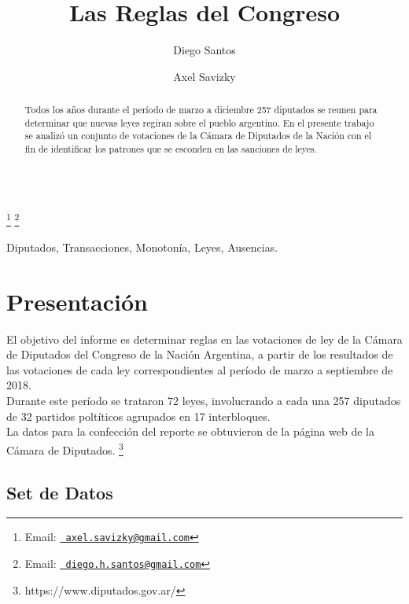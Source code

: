 \documentclass{endm}
\begin{document}
\begin{verbatim}\end{verbatim}\vspace{.5cm}
\begin{frontmatter}
\title{Las Reglas del Congreso}
\author{Diego Santos}
\author{Axel Savizky  }
\address{Reglas de Asociación y Simulación de Patrones - Departamento de Computación - Universidad de Buenos Aires - Bs.As., Argentina}
\thanks[raemail]{Email:
  \href{mailto:axel.savizky@gmail.com} {\texttt{\normalshape
   axel.savizky@gmail.com}}}
\thanks[sdemail]{Email:
  \href{mailto:diego.h.santos@gmail.com} {\texttt{\normalshape
   diego.h.santos@gmail.com}}}
\begin{abstract}
Todos los años durante el período de marzo a diciembre 257 diputados se reunen para determinar que nuevas leyes regiran sobre el pueblo argentino. En el presente trabajo se analizó un conjunto de votaciones de la Cámara de Diputados de la Nación con el fin de identificar los patrones que se esconden en las sanciones de leyes.
\end{abstract}
\begin{keyword}
Diputados, Transacciones, Monotonía, Leyes, Ausencias.
\end{keyword}
\end{frontmatter}
\section{Presentación}\label{intro}
El objetivo del informe es determinar reglas en las votaciones de ley de la Cámara de Diputados del Congreso de la Nación Argentina, a partir de los resultados de las votaciones de cada ley correspondientes al período de marzo a septiembre de 2018.\\

Durante este período se trataron 72 leyes, involucrando a cada una 257 diputados de 32 partidos poltíticos agrupados en 17 interbloques.\\

La datos para la confección del reporte se obtuvieron de la página web de la Cámara de Diputados. \footnote{https://www.diputados.gov.ar/}

\subsection{Set de Datos}
\end{document}
